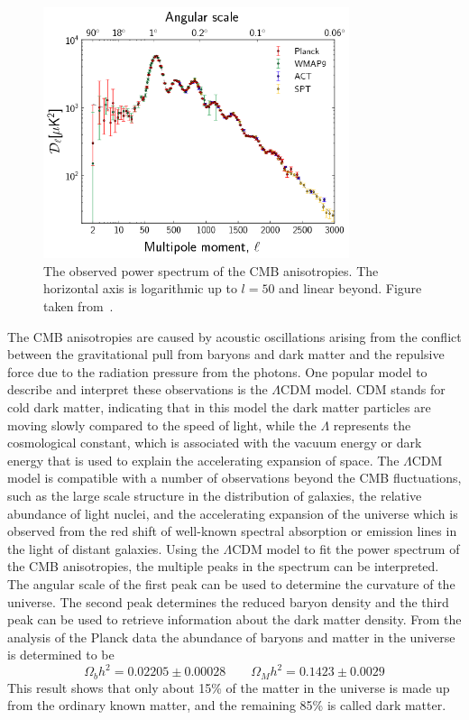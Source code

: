 \begin{figure}[ht]
  \centering
  \includegraphics[width=0.8\textwidth]{power_spectrum.png}\hfill%
  \caption{The observed power spectrum of the \ac{CMB} anisotropies. The horizontal axis is logarithmic up to $l = 50$ and linear beyond. Figure taken from~\cite{Ade:2013sjv}.}
  \label{fig:powerspectrum}
\end{figure}

The \ac{CMB} anisotropies are caused by acoustic oscillations arising from the conflict between the gravitational pull from baryons and dark matter and the repulsive force due to the radiation pressure from the photons. One popular model to describe and interpret these observations is the $\Lambda$CDM model. CDM stands for cold dark matter, indicating that in this model the dark matter particles are moving slowly compared to the speed of light, while the $\Lambda$ represents the cosmological constant, which is associated with the vacuum energy or dark energy that is used to explain the accelerating expansion of space. The $\Lambda$CDM model is compatible with a number of observations beyond the \ac{CMB} fluctuations, such as the large scale structure in the distribution of galaxies, the relative abundance of light nuclei, and the accelerating expansion of the universe which is observed from the red shift of well-known spectral absorption or emission lines in the light of distant galaxies. Using the $\Lambda$CDM model to fit the power spectrum of the \ac{CMB} anisotropies, the multiple peaks in the spectrum can be interpreted. The angular scale of the first peak can be used to determine the curvature of the universe. The second peak determines the reduced baryon density and the third peak can be used to retrieve information about the dark matter density. From the analysis of the Planck data the abundance of baryons and matter in the universe is determined to be
\begin{equation}
 \Omega_b h^2 = 0.02205 \pm 0.00028 \qquad \Omega_M h^2 = 0.1423 \pm 0.0029
\end{equation}
This result shows that only about 15\% of the matter in the universe is made up from the ordinary known matter, and the remaining 85\% is called dark matter.

